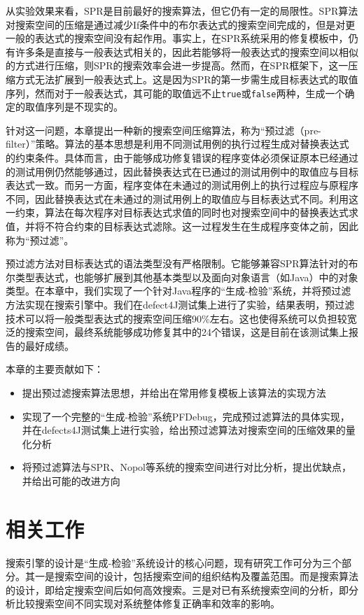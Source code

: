从实验效果来看，SPR是目前最好的搜索算法，但它仍有一定的局限性。SPR算法对搜索空间的压缩是通过减少If条件中的布尔表达式的搜索空间完成的，但是对更一般的表达式的搜索空间没有起作用。事实上，在SPR系统采用的修复模板中，仍有许多条是直接与一般表达式相关的，因此若能够将一般表达式的搜索空间以相似的方式进行压缩，则SPR的搜索效率会进一步提高。然而，在SPR框架下，这一压缩方式无法扩展到一般表达式上。这是因为SPR的第一步需生成目标表达式的取值序列，然而对于一般表达式，其可能的取值远不止\texttt{true}或\texttt{false}两种，生成一个确定的取值序列是不现实的。

针对这一问题，本章提出一种新的搜索空间压缩算法，称为“预过滤（pre-filter）”策略。算法的基本思想是利用不同测试用例的执行过程生成对替换表达式的约束条件。具体而言，由于能够成功修复错误的程序变体必须保证原本已经通过的测试用例仍然能够通过，因此替换表达式在已通过的测试用例中的取值应与目标表达式一致。而另一方面，程序变体在未通过的测试用例上的执行过程应与原程序不同，因此替换表达式在未通过的测试用例上的取值应与目标表达式不同。利用这一约束，算法在每次程序对目标表达式求值的同时也对搜索空间中的替换表达式求值，并将不符合约束的目标表达式滤除。这一过程发生在生成程序变体之前，因此称为“预过滤”。

预过滤方法对目标表达式的语法类型没有严格限制。它能够兼容SPR算法针对的布尔类型表达式，也能够扩展到其他基本类型以及面向对象语言（如Java）中的对象类型。在本章中，我们实现了一个针对Java程序的“生成-检验”系统，并将预过滤方法实现在搜索引擎中。我们在defect4J测试集上进行了实验，结果表明，预过滤技术可以将一般类型表达式的搜索空间压缩90\%左右。这也使得系统可以负担较宽泛的搜索空间，最终系统能够成功修复其中的24个错误，这是目前在该测试集上报告的最好成绩。

本章的主要贡献如下：
\begin{itemize}
	\item 提出预过滤搜索算法思想，并给出在常用修复模板上该算法的实现方法
	\item 实现了一个完整的“生成-检验”系统PFDebug，完成预过滤算法的具体实现，并在defects4J测试集上进行实验，给出预过滤算法对搜索空间的压缩效果的量化分析
	\item 将预过滤算法与SPR、Nopol等系统的搜索空间进行对比分析，提出优缺点，并给出可能的改进方向
\end{itemize}

\section{相关工作}%

搜索引擎的设计是“生成-检验”系统设计的核心问题，现有研究工作可分为三个部分。其一是搜索空间的设计，包括搜索空间的组织结构及覆盖范围。而是搜索算法的设计，即给定搜索空间后如何高效搜索。三是对已有系统搜索空间的分析，即分析比较搜索空间不同实现对系统整体修复正确率和效率的影响。

